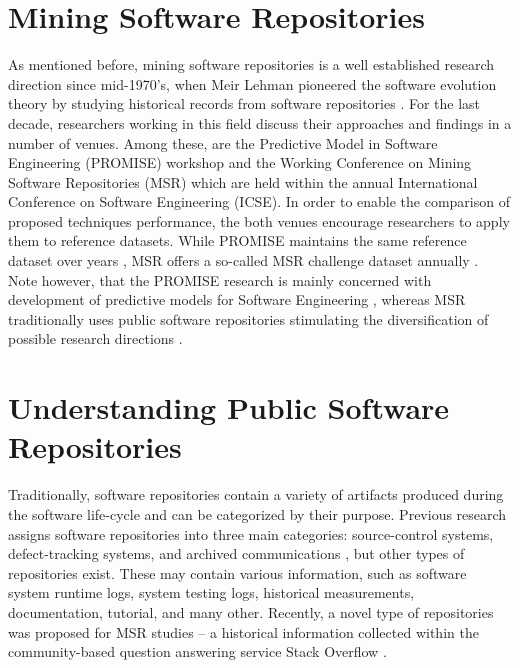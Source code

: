\section{Mining Software Repositories}
As mentioned before, mining software repositories is a well established research direction since 
mid-1970's, when Meir Lehman pioneered the software evolution theory by studying historical records from 
software repositories \cite{citeulike:2739216}. 
For the last decade, researchers working in this field discuss their approaches and findings in a number of venues. 
Among these, are the Predictive Model in Software Engineering (PROMISE) workshop and the Working Conference on Mining 
Software Repositories (MSR) which are held within the annual International Conference on Software Engineering (ICSE).
In order to enable the comparison of proposed techniques performance, the both venues encourage researchers to 
apply them to reference datasets. 
While PROMISE maintains the same reference dataset over years \cite{promise12}, 
MSR offers a so-called MSR challenge dataset annually \cite{MSRChallenge2012} \cite{MSRChallenge2013}.
Note however, that the {PROMISE} research is mainly concerned with development of predictive models for 
Software Engineering \cite{Menzies13}, whereas MSR traditionally uses public software repositories stimulating 
the diversification of possible research directions \cite{citeulike:12550438} \cite{citeulike:2710928} \cite{citeulike:7853299}.

\section{Understanding Public Software Repositories}\label{section_understanding}
Traditionally, software repositories contain a variety of artifacts produced during the software life-cycle
and can be categorized by their purpose.
Previous research assigns software repositories into three main categories: source-control systems, 
defect-tracking systems, and archived communications \cite{citeulike:4534888}, but other types of repositories exist. 
These may contain various information, such as software system runtime logs, system testing logs, 
historical measurements, documentation, tutorial, and many other.
Recently, a novel type of repositories was proposed for MSR studies -- a historical information collected within the 
community-based question answering service Stack Overflow \cite{MSRChallenge2013}.

